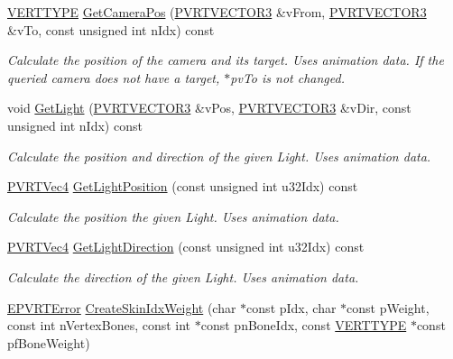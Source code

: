 \begin{DoxyCompactItemize}
\hyperlink{group___a_p_i___o_g_l_e_s_ga06da457b7d3e93368ab904f89e1396be}{V\+E\+R\+T\+T\+Y\+P\+E} \hyperlink{class_c_p_v_r_t_model_p_o_d_a169b7cd0640846ee50a1ec7f1ba72550}{Get\+Camera\+Pos} (\hyperlink{struct_p_v_r_t_v_e_c_t_o_r3f}{P\+V\+R\+T\+V\+E\+C\+T\+O\+R3} \&v\+From, \hyperlink{struct_p_v_r_t_v_e_c_t_o_r3f}{P\+V\+R\+T\+V\+E\+C\+T\+O\+R3} \&v\+To, const unsigned int n\+Idx) const 
\begin{DoxyCompactList}\small\item\em Calculate the position of the camera and its target. Uses animation data. If the queried camera does not have a target, $\ast$pv\+To is not changed. \end{DoxyCompactList}\item 
void \hyperlink{class_c_p_v_r_t_model_p_o_d_ae0cde5db69dc26398e815e28b4f33acf}{Get\+Light} (\hyperlink{struct_p_v_r_t_v_e_c_t_o_r3f}{P\+V\+R\+T\+V\+E\+C\+T\+O\+R3} \&v\+Pos, \hyperlink{struct_p_v_r_t_v_e_c_t_o_r3f}{P\+V\+R\+T\+V\+E\+C\+T\+O\+R3} \&v\+Dir, const unsigned int n\+Idx) const 
\begin{DoxyCompactList}\small\item\em Calculate the position and direction of the given Light. Uses animation data. \end{DoxyCompactList}\item 
\hyperlink{struct_p_v_r_t_vec4}{P\+V\+R\+T\+Vec4} \hyperlink{class_c_p_v_r_t_model_p_o_d_a593d96ac61ad735488dff4cef4e699b8}{Get\+Light\+Position} (const unsigned int u32\+Idx) const 
\begin{DoxyCompactList}\small\item\em Calculate the position the given Light. Uses animation data. \end{DoxyCompactList}\item 
\hyperlink{struct_p_v_r_t_vec4}{P\+V\+R\+T\+Vec4} \hyperlink{class_c_p_v_r_t_model_p_o_d_a904e919dc7ffa58127e9cff141f146bd}{Get\+Light\+Direction} (const unsigned int u32\+Idx) const 
\begin{DoxyCompactList}\small\item\em Calculate the direction of the given Light. Uses animation data. \end{DoxyCompactList}\item 
\hyperlink{_p_v_r_t_error_8h_a9e837ff1a83f3a5f332bc4cc78454608}{E\+P\+V\+R\+T\+Error} \hyperlink{class_c_p_v_r_t_model_p_o_d_a6b13bc7df2c7e50ddc3ede10233e12ec}{Create\+Skin\+Idx\+Weight} (char $\ast$const p\+Idx, char $\ast$const p\+Weight, const int n\+Vertex\+Bones, const int $\ast$const pn\+Bone\+Idx, const \hyperlink{group___a_p_i___o_g_l_e_s_ga06da457b7d3e93368ab904f89e1396be}{V\+E\+R\+T\+T\+Y\+P\+E} $\ast$const pf\+Bone\+Weight)

\end{DoxyCompactItemize}
